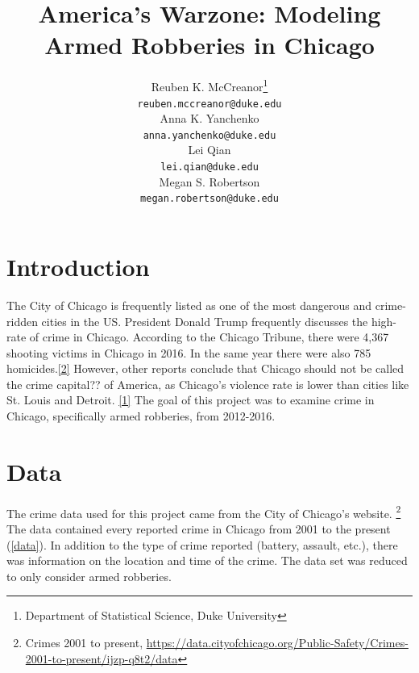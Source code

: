 \documentclass{article} %
\title{America's Warzone: Modeling Armed Robberies in Chicago}
\author{
Reuben K. McCreanor\thanks{Department of Statistical Science, Duke University} \\  
\texttt{reuben.mccreanor@duke.edu} \\
\And
Anna K. Yanchenko\footnotemark[1] \\
\texttt{anna.yanchenko@duke.edu} \\
\And 
Lei Qian\footnotemark[1] \\
\texttt{lei.qian@duke.edu} \\
\And
Megan S. Robertson\footnotemark[1] \\
\texttt{megan.robertson@duke.edu} \\ 
}
\begin{document}
\maketitle

\section{Introduction}
\label{headings}

\noindent The City of Chicago is frequently listed as one of the most dangerous and crime-ridden cities in the US. President Donald Trump frequently discusses the high-rate of crime in Chicago. According to the Chicago Tribune, there were 4,367 shooting victims in Chicago in 2016. In the same year there were also 785 homicides.\hyperlink{Ref2}{[2]} However, other reports conclude that Chicago should not be called the crime capital?? of America, as Chicago's violence rate is lower than cities like St.  Louis and Detroit. \hyperlink{Ref1}{[1]} The goal of this project was to examine crime in Chicago, specifically armed robberies, from 2012-2016. \newline

\section{Data}
\label{headings}

\noindent The crime data used for this project came from the City of Chicago's website. \footnote{Crimes 2001 to present, \url{https://data.cityofchicago.org/Public-Safety/Crimes-2001-to-present/ijzp-q8t2/data}} The data contained every reported crime in Chicago from 2001 to the present (\autoref{data}). In addition to the type of crime reported (battery, assault, etc.), there was information on the location and time of the crime. The data set was reduced to only consider armed robberies. 
\end{document}
